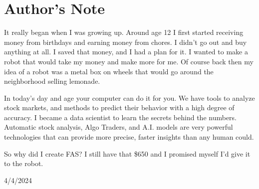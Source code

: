 \documentclass[12pt]{article}
\begin{document}

\vspace*{1in}

\section*{Author's Note}

It really began when I was growing up. Around age 12 I first started receiving money from birthdays and earning money from chores. I didn't go out and buy anything at all. I saved that money, and I had a plan for it. I wanted to make a robot that would take my money and make more for me. Of course back then my idea of a robot was a metal box on wheels that would go around the neighborhood selling lemonade. 

\vspace{12pt}

In today's day and age your computer can do it for you. We have tools to analyze stock markets, and methods to predict their behavior with a high degree of accuracy. I became a data scientist to learn the secrets behind the numbers. Automatic stock analysis, Algo Traders, and A.I. models are very powerful technologies that can provide more precise, faster insights than any human could.

\vspace{12pt}

So why did I create FAS? I still have that \$650 and I promised myself I'd give it to the robot.

\vspace{12pt}
4/4/2024
\end{document}
